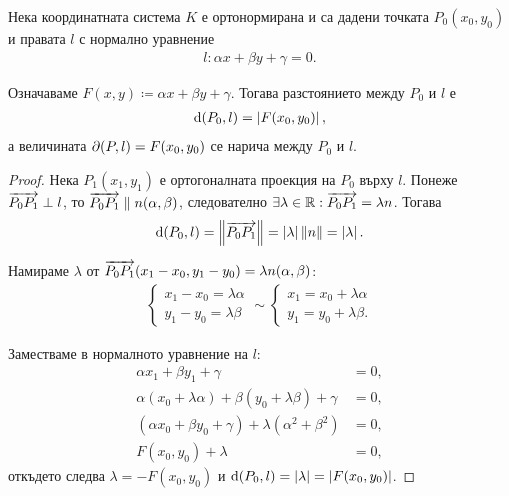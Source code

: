 \documentclass[numbers=endperiod, bibliography=totocnumbered]{scrartcl}
\begin{document}
\begin{theorem}\label{thm:plane_distance}
  Нека координатната система \( K \) е ортонормирана и са дадени точката \( P_0(x_0, y_0) \) и правата \( l \) с нормално уравнение
  \begin{align*}
    l: \alpha x + \beta y + \gamma = 0.
  \end{align*}

  Означаваме \( F(x, y) \coloneqq \alpha x + \beta y + \gamma \). Тогава разстоянието между \( P_0 \) и \( l \) е
  \begin{align*}
    \operatorname{d}(P_0, l) = \left\vert F(x_0, y_0) \right\vert,
  \end{align*}
  а величината \( \partial(P, l) = F(x_0, y_0) \) се нарича  между \( P_0 \) и \( l \).
\end{theorem}
\begin{proof}
  Нека \( P_1(x_1, y_1) \) е ортогоналната проекция на \( P_0 \) върху \( l \). Понеже \( \overrightarrow{P_0 P_1} \perp l \), то \( \overrightarrow{P_0 P_1} \parallel n(\alpha, \beta) \), следователно \( \exists \lambda \in \mathbb{R}: \overrightarrow{P_0 P_1} = \lambda n \). Тогава
  \begin{align*}
    \operatorname{d}(P_0, l)
    =
    \left\Vert \overrightarrow{P_0 P_1} \right\Vert
    =
    \left\vert \lambda \right\vert \left\Vert n \right\Vert
    =
    \left\vert \lambda \right\vert.
  \end{align*}

  Намираме \( \lambda \) от \( \overrightarrow{P_0 P_1}(x_1 - x_0, y_1 - y_0) = \lambda n(\alpha, \beta) \):
  \begin{align*}
    \begin{cases}
      x_1 - x_0 = \lambda \alpha \\
      y_1 - y_0 = \lambda \beta
    \end{cases}
    \sim
    \begin{cases}
      x_1 = x_0 + \lambda \alpha \\
      y_1 = y_0 + \lambda \beta.
    \end{cases}
  \end{align*}

  Заместваме в нормалното уравнение на \( l \):
  \begin{align*}
    \alpha x_1 + \beta y_1 + \gamma &= 0,
    \\
    \alpha (x_0 + \lambda \alpha) + \beta (y_0 + \lambda \beta) + \gamma &= 0,
    \\
    (\alpha x_0 + \beta y_0 + \gamma) + \lambda(\alpha^2 + \beta^2) &= 0,
    \\
    F(x_0, y_0) + \lambda &= 0,
  \end{align*}
  откъдето следва \( \lambda = -F(x_0, y_0) \) и \( \operatorname{d}(P_0, l) = \left\vert \lambda \right\vert = \left\vert F(x_0, y_0) \right\vert \).
\end{proof}
\end{document}
